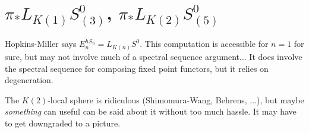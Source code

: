 \section{$\pi_* L_{K(1)} S^0_{(3)}$, $\pi_* L_{K(2)} S^0_{(5)}$}

Hopkins-Miller says $E_n^{hS_n} = L_{K(n)} S^0$.  This computation is accessible for $n = 1$ for sure, but may not involve much of a spectral sequence argument...  It does involve the spectral sequence for composing fixed point functors, but it relies on degeneration.

The $K(2)$-local sphere is ridiculous (Shimomura-Wang, Behrens, ...), but maybe \emph{something} can useful can be said about it without too much hassle.  It may have to get downgraded to a picture.
